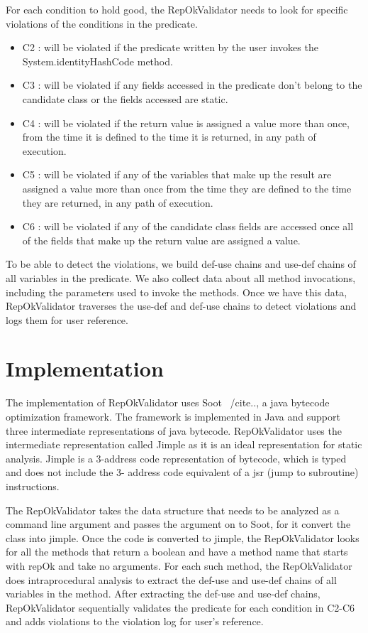 \par
For each condition to hold good, the RepOkValidator needs to look for specific violations of the conditions in the predicate. 
\begin{itemize}
\item C2 : will be violated if the predicate written by the user invokes the System.identityHashCode method.
\item C3 : will be violated if any fields accessed in the predicate don’t belong to the candidate class or the fields accessed are static.
\item C4 : will be violated if the return value is assigned a value more than once, from the time it is defined to the time it is returned, in any path of execution.
\item C5 : will be violated if any of the variables that make up the result are assigned a value more than once from the time they are defined to the time they are returned, in any path of execution.
\item C6 : will be violated if any of the candidate class fields are accessed once all of the fields that make up the return value are assigned a value.
\end{itemize}

\par
To be able to detect the violations, we build def-use chains and use-def chains of all variables in the predicate. We also collect data about all method invocations, including the parameters used to invoke the methods. Once we have this data, RepOkValidator traverses the use-def and def-use chains to detect violations and logs them for user reference.

\section{Implementation}
The implementation of RepOkValidator uses Soot ~/cite{..}, a java bytecode optimization framework. The framework is implemented in Java and support three intermediate representations of java bytecode. RepOkValidator uses the intermediate representation called Jimple as it is an ideal representation for static analysis. Jimple is a 3-address code representation of bytecode, which is typed and does not include the 3- address code equivalent of a jsr (jump to subroutine) instructions.

\par
The RepOkValidator takes the data structure that needs to be analyzed as a command line argument and passes the argument on to Soot, for it convert the class into jimple. Once the code is converted to jimple, the RepOkValidator looks for all the methods that return a boolean and have a method name that starts with repOk and take no arguments. For each such method, the RepOkValidator does intraprocedural analysis to extract the def-use and use-def chains of all variables in the method. After extracting the def-use and use-def chains, RepOkValidator sequentially validates the predicate for each condition in C2-C6 and adds violations to the violation log for user’s reference.

